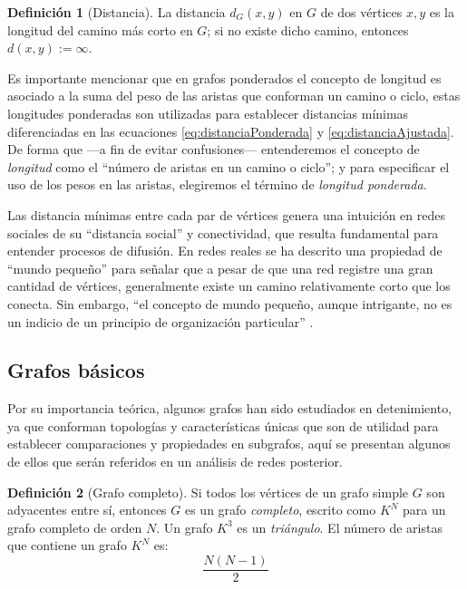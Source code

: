 \documentclass[letterpaper, 11pt]{book}
\theoremstyle{definition}
\newtheorem{definition}{Definición}[chapter]
\theoremstyle{remark}
\begin{document}
\begin{definition}[Distancia]
\label{Distancia}
	La distancia $d_{G}(x,y)$ en $G$ de dos vértices $x,y$ es la longitud del camino más corto en $G$; si no existe dicho camino, entonces $d(x,y):= \infty$.
\end{definition}


Es importante mencionar que en grafos ponderados el concepto de longitud es asociado a la suma del peso de las aristas que conforman un camino o ciclo, estas longitudes ponderadas son utilizadas para establecer distancias mínimas diferenciadas en las ecuaciones \ref{eq:distanciaPonderada} y \ref{eq:distanciaAjustada}. 
De forma que ---a fin de evitar confusiones--- entenderemos el concepto de \emph{longitud} como el ``número de aristas en un camino o ciclo''; y para especificar el uso de los pesos en las aristas, elegiremos el término de \emph{longitud ponderada}.

Las distancia mínimas entre cada par de vértices genera una intuición en redes sociales de su ``distancia social'' y conectividad, que resulta fundamental para entender procesos de difusión. 
En redes reales se ha descrito una propiedad de ``mundo pequeño'' para señalar que a pesar de que una red registre una gran cantidad de vértices, generalmente existe un camino relativamente corto que los conecta. 
Sin embargo, ``el concepto de mundo pequeño, aunque intrigante, no es un indicio de un principio de organización particular'' \citep[49]{2002_Barabasi_MechanicsOfComplexNetworks}. 



\subsection{Grafos básicos}
\label{sec:GrafosBasicos}

Por su importancia teórica, algunos grafos han sido estudiados en detenimiento, ya que conforman topologías y características únicas que son de utilidad para establecer comparaciones y propiedades en subgrafos, aquí se presentan algunos de ellos que serán referidos en un análisis de redes posterior.

\begin{definition}[Grafo completo]
\label{GafoCompleto}
	Si todos los vértices de un grafo simple $G$ son adyacentes entre sí, entonces $G$ es un grafo \emph{completo}, escrito como $K^{N}$ para un grafo completo de orden $N$. 
	Un grafo $K^{3}$ es un \emph{triángulo}. 
	El número de aristas que contiene un grafo $K^{N}$ es:
	\begin{equation}
	 \frac{N(N-1)}{2}
	\end{equation} 
\end{definition}
\end{document}
